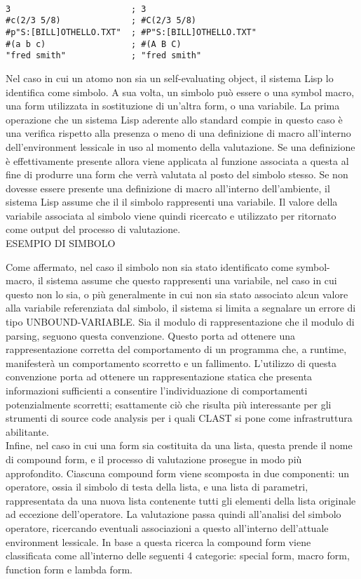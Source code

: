 \begin{lstlisting}

3                        ; 3
#c(2/3 5/8)              ; #C(2/3 5/8)
#p"S:[BILL]OTHELLO.TXT"  ; #P"S:[BILL]OTHELLO.TXT"
#(a b c)                 ; #(A B C)
"fred smith"             ; "fred smith"

\end{lstlisting}

Nel caso in cui un atomo non sia un self-evaluating object, il sistema Lisp lo
identifica come simbolo. A sua volta, un simbolo può essere o una symbol
macro, una form utilizzata in sostituzione di un’altra form, o una variabile.
La prima operazione che un sistema Lisp aderente allo standard compie in
questo caso è una verifica rispetto alla presenza o meno di una definizione di
macro all’interno dell’environment lessicale in uso al momento della
valutazione. Se una definizione è effettivamente presente allora viene
applicata al funzione associata a questa al fine di produrre una form che
verrà valutata al posto del simbolo stesso. Se non dovesse essere presente una
definizione di macro all’interno dell’ambiente, il sistema Lisp assume che il
il simbolo rappresenti una variabile. Il valore della variabile associata al
simbolo viene quindi ricercato e utilizzato per ritornato come output del
processo di valutazione.\\

ESEMPIO DI SIMBOLO

Come affermato, nel caso il simbolo non sia stato identificato come symbol-
macro, il sistema assume che questo rappresenti una variabile, nel caso in cui
questo non lo sia, o più generalmente in cui non sia stato associato alcun
valore alla variabile referenziata dal simbolo, il sistema si limita a
segnalare un errore di tipo UNBOUND-VARIABLE. Sia il modulo di
rappresentazione che il modulo di parsing, seguono questa convenzione. Questo
porta ad ottenere una rappresentazione corretta del comportamento di un
programma che, a runtime, manifesterà un comportamento scorretto e un
fallimento. L’utilizzo di questa convenzione porta ad ottenere un
rappresentazione statica che presenta informazioni sufficienti a consentire
l’individuazione di comportamenti potenzialmente scorretti; esattamente ciò
che risulta più interessante per gli strumenti di source code analysis per i
quali CLAST si pone come infrastruttura abilitante.\\

Infine, nel caso in cui una form sia costituita da una lista, questa prende il
nome di compound form, e il processo di valutazione prosegue in modo più
approfondito. Ciascuna compound form viene scomposta in due componenti: un
operatore, ossia il simbolo di testa della lista, e una lista di parametri,
rappresentata da una nuova lista contenente tutti gli elementi della lista
originale ad eccezione dell’operatore. La valutazione passa quindi all’analisi
del simbolo operatore, ricercando eventuali associazioni a questo all’interno
dell’attuale environment lessicale. In base a questa ricerca la compound form
viene classificata come all’interno delle seguenti 4 categorie: special form,
macro form, function form e lambda form.

